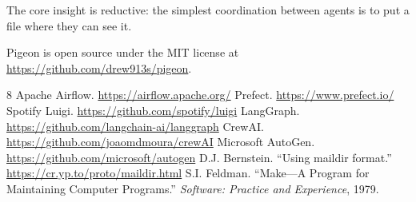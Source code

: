 \documentclass[11pt,a4paper]{article}
\begin{document}
The core insight is reductive: the simplest coordination between agents is to put a file where they can see it.

Pigeon is open source under the MIT license at \url{https://github.com/drew913s/pigeon}.

\begin{thebibliography}{8}
 Apache Airflow. \url{https://airflow.apache.org/}
 Prefect. \url{https://www.prefect.io/}
 Spotify Luigi. \url{https://github.com/spotify/luigi}
 LangGraph. \url{https://github.com/langchain-ai/langgraph}
 CrewAI. \url{https://github.com/joaomdmoura/crewAI}
 Microsoft AutoGen. \url{https://github.com/microsoft/autogen}
 D.J. Bernstein. ``Using maildir format.'' \url{https://cr.yp.to/proto/maildir.html}
 S.I. Feldman. ``Make---A Program for Maintaining Computer Programs.'' \emph{Software: Practice and Experience}, 1979.
\end{thebibliography}
\end{document}
